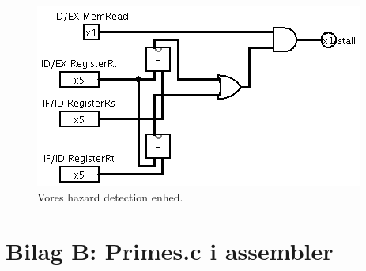 \documentclass [10pt,a4paper]{article}
\begin{document}
\begin{figure}[h!]
  \centering  
    \includegraphics[scale=0.7]{hazard.png}
  \caption{Vores hazard detection enhed.}
\end{figure}


\clearpage

\section*{Bilag B: Primes.c i assembler}

\end{document}
